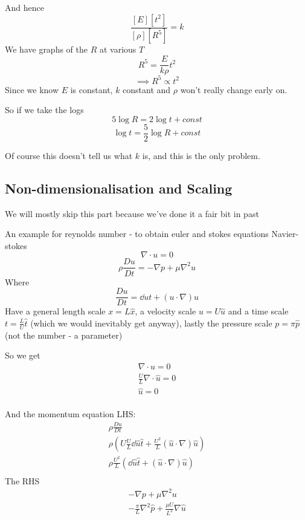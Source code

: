 \documentclass{X:/Documents/Coding/Latex/myassignment}
\begin{document}
And hence
\[\frac{[E][t^2]}{[\rho][R^5]} = k\]
We have graphs of the $R$ at various $T$
\[R^5 = \frac{E}{k\rho} t^2\]
\[\implies R^5 \propto t^2\]
Since we know $E$ is constant, $k$ constant and $\rho$ won't really change early on.

So if we take the logs
\[5\log R = 2\log t + const\]
\[\log t = \frac52 \log R + const\]

Of course this doesn't tell us what $k$ is, and this is the only problem.

\subsection{Non-dimensionalisation and Scaling}
We will mostly skip this part because we've done it a fair bit in past

An example for reynolds number - to obtain euler and stokes equations
Navier-stokes
\[\nabla \cdot u = 0\]
\[\rho \frac{Du}{Dt} = -\nabla p + \mu \nabla^2 u\]
Where
\[\frac{Du}{Dt} = \dd ut + (u\cdot \nabla) u\]
Have a general length scale $x = L \hat{x}$, a velocity scale $u = U \hat u$ and a time scale $t = \frac{L}{U} \hat{t}$ (which we would inevitably get anyway), lastly the pressure scale $p = \pi \hat{p}$ (not the number - a parameter)

So we get
\begin{align*}
	\nabla \cdot u = 0\\
	\frac{U}{L} \nabla \cdot \hat u = 0\\
	\hat u = 0\\
\end{align*}

And the momentum equation
LHS:
\begin{align*}
	\rho \frac{Du}{Dt} \\
	\rho\left(U\frac{U}{L} \dd{\hat{u}}{\hat{t}} + \frac{U^2}{L} (\hat{u}\cdot \nabla) \hat{u}\right)\\
	\rho \frac{U^2}{L}\left( \dd{\hat{u}}{\hat{t}} +(\hat{u}\cdot \nabla) \hat{u}\right)\\
\end{align*}
The RHS
\begin{align*}
	-\nabla p + \mu \nabla^2 u\\
	-\frac{\pi}{L} \nabla^2 \hat{p} + \frac{\mu U}{L^2} \nabla \hat{u}
\end{align*}
\end{document}

